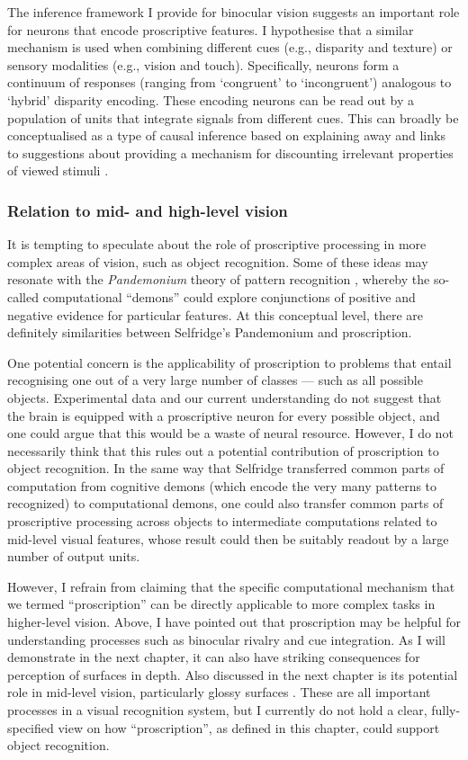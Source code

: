 The inference framework I provide for binocular vision suggests an important role for neurons that encode proscriptive features. I hypothesise that a similar mechanism is used when combining different cues (e.g., disparity and texture) or sensory modalities (e.g., vision and touch). Specifically, neurons form a continuum of responses (ranging from `congruent' to `incongruent') analogous to `hybrid' disparity encoding. These encoding neurons can be read out by a population of units that integrate signals from different cues. This can broadly be conceptualised as a type of causal inference based on explaining away \cite {Wellman:1993el} and links to suggestions about providing a mechanism for discounting irrelevant properties of viewed stimuli \cite{Kim:2016hd}.

\subsubsection*{Relation to mid- and high-level vision}

It is tempting to speculate about the role of proscriptive processing in more complex areas of vision, such as object recognition. Some of these ideas may resonate with the {\it Pandemonium} theory of pattern recognition \cite{selfridge:59}, whereby the so-called computational ``demons'' could explore conjunctions of positive and negative evidence for particular features. At this conceptual level, there are definitely similarities between Selfridge's Pandemonium and proscription.

One potential concern is the applicability of proscription to problems that entail recognising one out of a very large number of classes --- such as all possible objects. Experimental data and our current understanding do not suggest that the brain is equipped with a proscriptive neuron for every possible object, and one could argue that this would be a waste of neural resource. However, I do not necessarily think that this rules out a potential contribution of proscription to object recognition. In the same way that Selfridge transferred common parts of computation from cognitive demons (which encode the very many patterns to recognized) to computational demons, one could also transfer common parts of proscriptive processing across objects to intermediate computations related to mid-level visual features, whose result could then be suitably readout by a large number of output units.

However, I refrain from claiming that the specific computational mechanism that we termed ``proscription'' can be directly applicable to more complex tasks in higher-level vision. Above, I have pointed out that proscription may be helpful for understanding processes such as binocular rivalry and cue integration. As I will demonstrate in the next chapter, it can also have striking consequences for perception of surfaces in depth. Also discussed in the next chapter is its potential role in mid-level vision, particularly glossy surfaces \cite{Muryy:2016km}. These are all important processes in a visual recognition system, but I currently do not hold a clear, fully-specified view on how ``proscription'', as defined in this chapter, could support object recognition.


